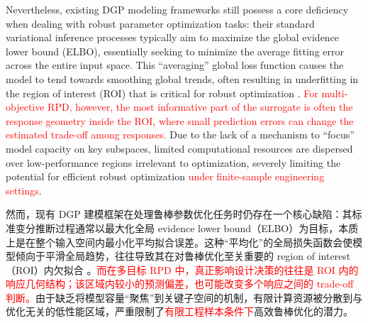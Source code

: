 \documentclass[11pt]{article}
\begin{document}
Nevertheless, existing DGP modeling frameworks still possess a core deficiency when dealing with robust parameter optimization tasks: their standard variational inference processes typically aim to maximize the global evidence lower bound (ELBO), essentially seeking to minimize the average fitting error across the entire input space. This ``averaging'' global loss function causes the model to tend towards smoothing global trends, often resulting in underfitting in the region of interest (ROI) that is critical for robust optimization \citep{Zhang2022}. \textcolor{red}{For multi-objective RPD, however, the most informative part of the surrogate is often the response geometry inside the ROI, where small prediction errors can change the estimated trade-off among responses.} Due to the lack of a mechanism to ``focus'' model capacity on key subspaces, limited computational resources are dispersed over low-performance regions irrelevant to optimization, severely limiting the potential for efficient robust optimization \textcolor{red}{under finite-sample engineering settings}.

然而，现有 DGP 建模框架在处理鲁棒参数优化任务时仍存在一个核心缺陷：其标准变分推断过程通常以最大化全局 evidence lower bound（ELBO）为目标，本质上是在整个输入空间内最小化平均拟合误差。这种“平均化”的全局损失函数会使模型倾向于平滑全局趋势，往往导致其在对鲁棒优化至关重要的 region of interest（ROI）内欠拟合 \citep{Zhang2022}。\textcolor{red}{而在多目标 RPD 中，真正影响设计决策的往往是 ROI 内的响应几何结构；该区域内较小的预测偏差，也可能改变多个响应之间的 trade-off 判断。}由于缺乏将模型容量“聚焦”到关键子空间的机制，有限计算资源被分散到与优化无关的低性能区域，严重限制了\textcolor{red}{有限工程样本条件下}高效鲁棒优化的潜力。
\end{document}
